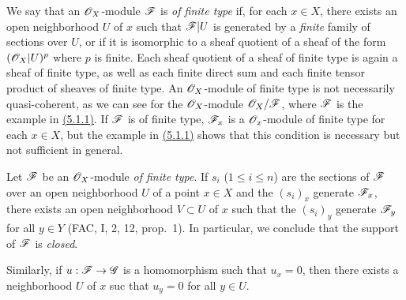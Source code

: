\begin{env}[5.2.1]
\label{env-0.5.2.1}
We say that an $\mathscr{O}_X$-module $\mathscr{F}$ is {\em of finite type} if, for each $x\in X$, there
exists an open neighborhood $U$ of $x$ such that $\mathscr{F}|U$ is generated by a {\em finite}
family of sections over $U$, or if it is isomorphic to a sheaf quotient of a sheaf of the
form $(\mathscr{O}_X|U)^p$ where $p$ is finite. Each sheaf quotient of a sheaf of finite type is
again a sheaf of finite type, as well as each finite direct sum and each finite tensor
product of sheaves of finite type. An $\mathscr{O}_X$-module of finite type is not necessarily
quasi-coherent, as we can see for the $\mathscr{O}_X$-module $\mathscr{O}_X/\mathscr{F}$, where $\mathscr{F}$ is the
example in \hyperref[env-0.5.1.1]{(5.1.1)}. If $\mathscr{F}$ is of finite type, $\mathscr{F}_x$ is a $\mathscr{O}_x$-module
of finite type for each $x\in X$, but the example in \hyperref[env-0.5.1.1]{(5.1.1)} shows that this
condition is necessary but not sufficient in general.
\end{env}

\begin{env}[5.2.2]
\label{env-0.5.2.2}
Let $\mathscr{F}$ be an $\mathscr{O}_X$-module {\em of finite type}. If $s_i$ ($1\leqslant i\leqslant n$)
are the sections of $\mathscr{F}$ over an open neighborhood $U$ of a point $x\in X$ and the
$(s_i)_x$ generate $\mathscr{F}_x$, there exists an open neighborhood $V\subset U$ of $x$ such
that the $(s_i)_y$ generate $\mathscr{F}_y$ for all $y\in Y$ (FAC, I, 2, 12, prop.~1). In
particular, we conclude that the support of $\mathscr{F}$ is {\em closed}.

Similarly, if $u:\mathscr{F}\to\mathscr{G}$ is a homomorphism such that $u_x=0$, then there exists a
neighborhood $U$ of $x$ suc that $u_y=0$ for all $y\in U$.
\end{env}

